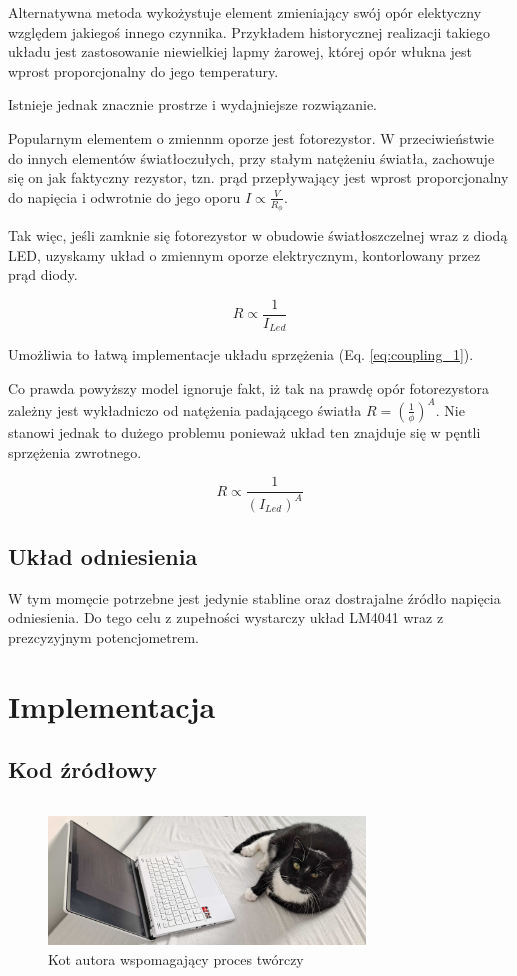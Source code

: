 \documentclass[12pt, a4paper]{article}
\begin{document}
Alternatywna metoda wykożystuje element zmieniający swój opór elektyczny względem jakiegoś innego czynnika.
Przykładem historycznej realizacji takiego układu jest zastosowanie niewielkiej lapmy żarowej,
której opór włukna jest wprost proporcjonalny do jego temperatury.

Istnieje jednak znacznie prostrze i wydajniejsze rozwiązanie.

Popularnym elementem o zmiennm oporze jest fotorezystor. W przeciwieństwie do innych elementów
światłoczułych, przy stałym natężeniu światła, zachowuje się on jak faktyczny rezystor,
tzn. prąd przepływający jest wprost proporcjonalny do napięcia i odwrotnie do jego oporu
$I \propto \frac{V}{R_{\phi}}$.

Tak więc, jeśli zamknie się fotorezystor w obudowie światłoszczelnej wraz z diodą LED,
uzyskamy układ o zmiennym oporze elektrycznym, kontorlowany przez prąd diody.

\begin{equation}
	R \propto \frac{1}{I_{Led}}
\end{equation}

Umożliwia to łatwą implementacje układu sprzężenia (Eq. \ref{eq:coupling_1}). 

Co prawda powyższy model ignoruje fakt,
iż tak na prawdę opór fotorezystora zależny jest wykładniczo od natężenia padającego światła
$R = \left(\frac{1}{\phi}\right)^A$. Nie stanowi jednak to dużego problemu ponieważ układ ten znajduje się w 
pęntli sprzężenia zwrotnego.

\begin{equation}
	R \propto \frac{1}{(I_{Led})^A}
\end{equation}

\subsection{Układ odniesienia}
W tym momęcie potrzebne jest jedynie stabline oraz dostrajalne źródło napięcia odniesienia.
Do tego celu z zupełności wystarczy układ LM4041 wraz z prezcyzyjnym potencjometrem.

\section{Implementacja}

\subsection{Kod źródłowy}

\begin{figure}
	\inputminted{asm}{../src/main.S}
\end{figure}

\newpage
\printbibliography %

\newpage

\begin{figure}
	\centering
	\includegraphics[width=0.75\textwidth]{img/kot_enter.jpg}
	\caption{Kot autora wspomagający proces twórczy}
\end{figure}
\end{document}
